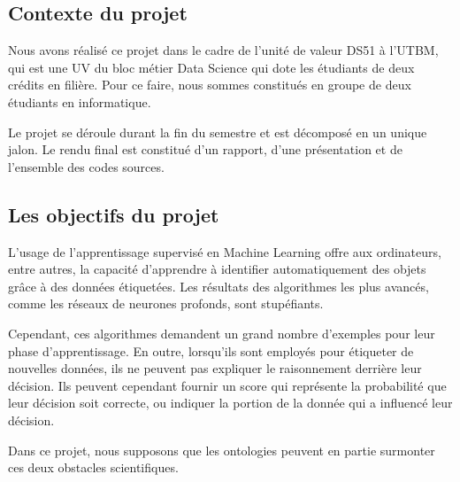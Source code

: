 

\subsection{Contexte du projet}

Nous avons réalisé ce projet dans le cadre de l'unité de valeur DS51 à l'UTBM, qui est une UV du bloc métier Data Science qui dote les étudiants de deux crédits en filière. 
Pour ce faire, nous sommes constitués en groupe de deux étudiants en informatique. 


Le projet se déroule durant la fin du semestre et est décomposé en un unique jalon. Le rendu final est constitué d'un rapport, d'une présentation et de l'ensemble des codes sources.




\subsection{Les objectifs du projet}


L'usage de l'apprentissage supervisé en Machine Learning offre aux ordinateurs, entre autres, la capacité d'apprendre à identifier automatiquement des objets grâce à des données étiquetées. 
Les résultats des algorithmes les plus avancés, comme les réseaux de neurones profonds, sont stupéfiants.

Cependant, ces algorithmes demandent un grand nombre d'exemples pour leur phase d'apprentissage. 
En outre, lorsqu'ils sont employés pour étiqueter de nouvelles données, ils ne peuvent pas expliquer le raisonnement derrière leur décision. 
Ils peuvent cependant fournir un score qui représente la probabilité que leur décision soit correcte, ou indiquer la portion de la donnée qui a influencé leur décision.

Dans ce projet, nous supposons que les ontologies peuvent en partie surmonter ces deux obstacles scientifiques.